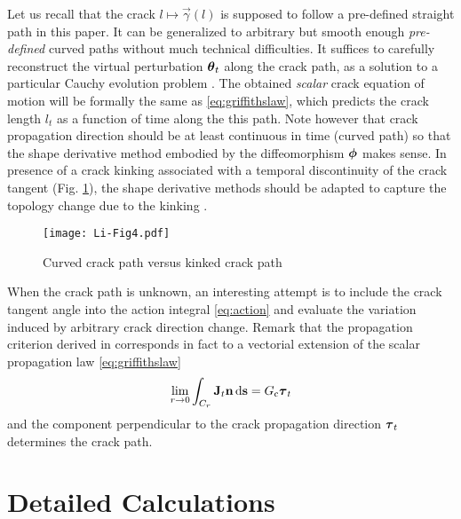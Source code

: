 \begin{remark}
Let us recall that the crack $l\mapsto\vec{\gamma}(l)$ is supposed to follow a pre-defined straight path in this paper. It can be generalized to arbitrary but smooth enough \emph{pre-defined} curved paths without much technical difficulties. It suffices to carefully reconstruct the virtual perturbation $\vtheta_t$ along the crack path, as a solution to a particular Cauchy evolution problem \cite{KhludnevSokolowskiSzulc:2010}. The obtained \emph{scalar} crack equation of motion will be formally the same as \eqref{eq:griffithslaw}, which predicts the crack length $l_t$ as a function of time along the this path. Note however that crack propagation direction should be at least continuous in time (curved path) so that the shape derivative method embodied by the diffeomorphism $\philt$ makes sense. In presence of a crack kinking associated with a temporal discontinuity of the crack tangent (Fig. \ref{fig:kinking}), the shape derivative methods should be adapted to capture the topology change due to the kinking \cite{Hintermuller:2011}.
\begin{figure}[htbp]\sidecaption
\centering
\texttt{[image: Li-Fig4.pdf]}
\caption{\small Curved crack path versus kinked crack path} \label{fig:kinking}
\end{figure}

When the crack path is unknown, an interesting attempt is to include the crack tangent angle into the action integral \eqref{eq:action} and evaluate the variation induced by arbitrary crack direction change. Remark that the propagation criterion derived in \cite{Oleaga:2001,Adda-BediaAriasAmarLund:1999} corresponds in fact to a vectorial extension of the scalar propagation law \eqref{eq:griffithslaw}
\[
\lim_{r\to 0}\int_{C_r}\vec{J}_t\vec{n}\ds=\gc\vtau_t
\]
and the component perpendicular to the crack propagation direction $\vtau_t$ determines the crack path.  
\end{remark}

\chapter{Detailed Calculations}
